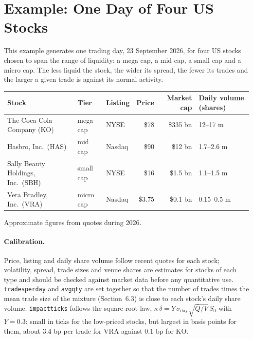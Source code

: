 \documentclass[11pt,a4paper]{article}
\newcommand{\key}[1]{\texttt{#1}}
\theoremstyle{paper}
\begin{document}
\appendix
\section{Example: One Day of Four US Stocks}\label{app:example}

This example generates one trading day, 23 September 2026, for four US stocks chosen to span the range of liquidity: a mega cap, a mid cap, a small cap and a micro cap. The less liquid the stock, the wider its spread, the fewer its trades and the larger a given trade is against its normal activity.

\begin{center}
\small
\begin{tabularx}{\linewidth}{@{}>{\raggedright\arraybackslash}Xllrrl@{}}
\toprule
\textbf{Stock} & \textbf{Tier} & \textbf{Listing} & \textbf{Price} & \textbf{Market cap} & \textbf{Daily volume (shares)}\\
\midrule
The Coca-Cola Company (KO) & mega cap & NYSE & \$78 & \$335 bn & 12--17 m\\
Hasbro, Inc.\ (HAS) & mid cap & Nasdaq & \$90 & \$12 bn & 1.7--2.6 m\\
Sally Beauty Holdings, Inc.\ (SBH) & small cap & NYSE & \$16 & \$1.5 bn & 1.1--1.5 m\\
Vera Bradley, Inc.\ (VRA) & micro cap & Nasdaq & \$3.75 & \$0.1 bn & 0.15--0.5 m\\
\bottomrule
\end{tabularx}

\smallskip
{\footnotesize Approximate figures from quotes during 2026.}
\end{center}

\paragraph{Calibration.} Price, listing and daily share volume follow recent quotes for each stock; volatility, spread, trade sizes and venue shares are estimates for stocks of each type and should be checked against market data before any quantitative use. \key{tradesperday} and \key{avgqty} are set together so that the number of trades times the mean trade size of the mixture (Section~6.3) is close to each stock's daily share volume. \key{impactticks} follows the square-root law, $\kappa\,\delta = Y\,\sigma_{\text{day}}\sqrt{\bar Q/V}\,S_0$ with $Y=0.3$: small in ticks for the low-priced stocks, but largest in basis points for them, about 3.4 bp per trade for VRA against 0.1 bp for KO.
\end{document}
